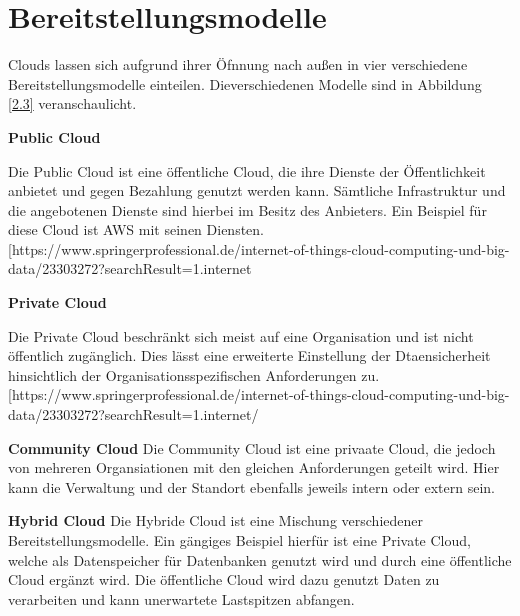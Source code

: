 \section{Bereitstellungsmodelle}
Clouds lassen sich aufgrund ihrer Öfnnung nach außen in vier verschiedene Bereitstellungsmodelle einteilen. Dieverschiedenen Modelle sind in Abbildung \ref{2.3} veranschaulicht. 

\textbf{Public Cloud}

Die Public Cloud ist eine öffentliche Cloud, die ihre Dienste der Öffentlichkeit anbietet und gegen Bezahlung genutzt werden kann. Sämtliche Infrastruktur und die angebotenen Dienste sind hierbei im Besitz des Anbieters. Ein Beispiel für diese Cloud ist AWS mit seinen Diensten.[https://www.springerprofessional.de/internet-of-things-cloud-computing-und-big-data/23303272?searchResult=1.internet%

\textbf{Private Cloud}

Die Private Cloud beschränkt sich meist auf eine Organisation und ist nicht öffentlich zugänglich. Dies lässt eine erweiterte Einstellung der Dtaensicherheit hinsichtlich der Organisationsspezifischen Anforderungen zu. [https://www.springerprofessional.de/internet-of-things-cloud-computing-und-big-data/23303272?searchResult=1.internet/%

\textbf{Community Cloud}
Die Community Cloud ist eine privaate Cloud, die jedoch von mehreren Organsiationen mit den gleichen Anforderungen geteilt wird. Hier kann die Verwaltung und der Standort ebenfalls jeweils intern oder extern sein.

\textbf{Hybrid Cloud}
Die Hybride Cloud ist eine Mischung verschiedener Bereitstellungsmodelle. Ein gängiges Beispiel hierfür ist eine Private Cloud, welche als Datenspeicher für Datenbanken genutzt wird und durch eine öffentliche Cloud ergänzt wird. Die öffentliche Cloud wird dazu genutzt Daten zu verarbeiten und kann unerwartete Lastspitzen abfangen.

